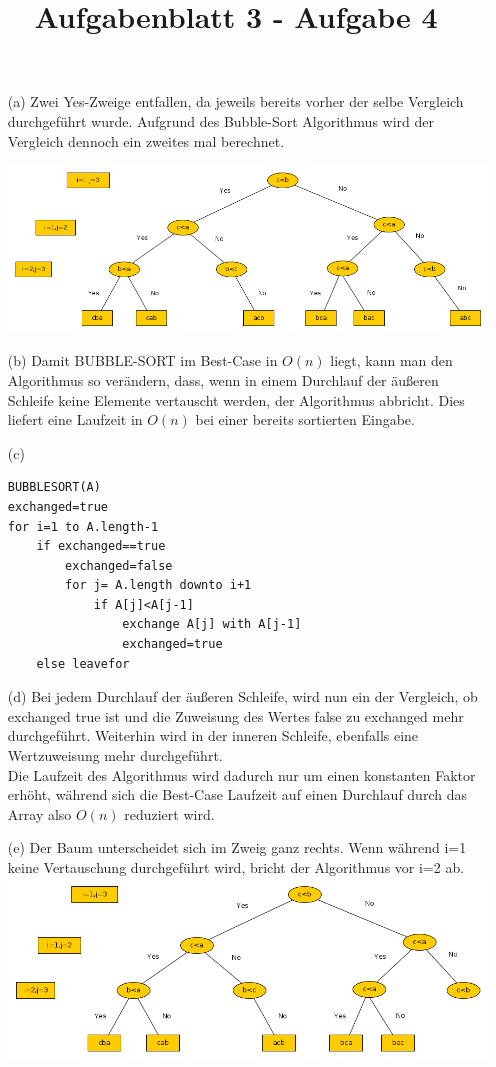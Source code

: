 \documentclass{article}
\title{Aufgabenblatt 3 - Aufgabe 4}
\author{}
\begin{document}
\maketitle

\begin{enumerate}
\item[(a)]Zwei Yes-Zweige entfallen, da jeweils bereits vorher der selbe Vergleich durchgef\"uhrt wurde. Aufgrund des Bubble-Sort Algorithmus wird der Vergleich dennoch ein zweites mal berechnet.\\
\begin{center}
\includegraphics[scale=0.4]{4aGraph.png}\\
\end{center}
\item[(b)]
Damit BUBBLE-SORT im Best-Case in $O(n)$ liegt, kann man den Algorithmus so verändern, dass, wenn in einem Durchlauf der \"au{\ss}eren Schleife keine Elemente vertauscht werden, der Algorithmus abbricht. Dies liefert eine Laufzeit in $O(n)$ bei einer bereits sortierten Eingabe.
\item[(c)]
\begin{lstlisting}
BUBBLESORT(A)
exchanged=true
for i=1 to A.length-1
	if exchanged==true
		exchanged=false
		for j= A.length downto i+1
			if A[j]<A[j-1]
				exchange A[j] with A[j-1]
				exchanged=true
	else leavefor
\end{lstlisting}
\item[(d)]
Bei jedem Durchlauf der \"außeren Schleife, wird nun ein der Vergleich, ob exchanged true ist und die Zuweisung des Wertes false zu exchanged mehr durchgef\"uhrt. Weiterhin wird in der inneren Schleife, ebenfalls eine Wertzuweisung mehr durchgef\"uhrt. \\
Die Laufzeit des Algorithmus wird dadurch nur um einen konstanten Faktor erh\"oht, w\"ahrend sich die Best-Case Laufzeit auf einen Durchlauf durch das Array also $O(n)$ reduziert wird.
\item[(e)]Der Baum unterscheidet sich im Zweig ganz rechts. Wenn w\"ahrend i=1 keine Vertauschung durchgef\"uhrt wird, bricht der Algorithmus vor i=2 ab. \\
\includegraphics[scale=0.4]{4eGraph.png}\\
\end{enumerate}
\end{document}
